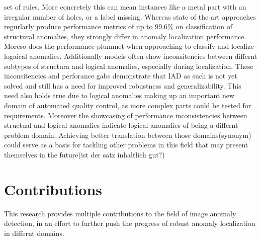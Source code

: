set of rules. More concretely this can mean instances like a metal part with an irregular number of holes, or a label missing. Whereas 
state of the art approaches regurlarly produce performance metrics of up to $99.6 \% $ on classification of structural anomalies, they 
strongly differ in anomaly localization performance. Moreso does the performance plummet when approaching to classify and localize logaical 
anomalies. Additionally models often show inconsitencies between differnt subtypes of structura and logical anomalies, especially during 
localization. These inconsitencies and perforance gabs demonstrate that IAD as such is not yet solved and still has a need for improved 
robustness and generalizability. This need also holds true due to logical anomalies making up an important new domain of automated 
quality control, as more complex parts could be tested for requirements. Moreover the showcasing of performance inconsistencies between 
structual and logical anomalies indicate logical anomalies of being a differnt problem domain. Achieving better translation between those 
domains(synonym) could serve as a basis for tackling other problems in this field that may present themselves in the future(ist der satz 
inhaltlich gut?)



\section{Contributions}
This research provides multiple contributions to the field of image anomaly detection, in an effort to further push the progress of 
robust anomaly localization in differnt domains. 

